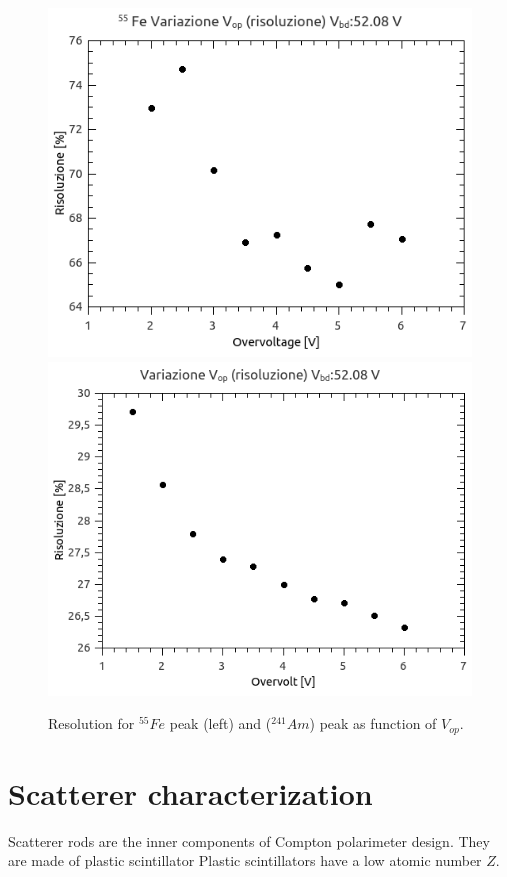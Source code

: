 \documentclass[10pt,a4paper, openany]{book}
\begin{document}
\begin{figure}[!h]
\begin{center}
\includegraphics[scale=0.35]{imm/resfe.png}
\includegraphics[scale=0.35]{imm/resam.png}
\end{center}
\caption{Resolution for $^{55}Fe$ peak (left) and ($^{241}Am$) peak as function of $V_{op}$.} 
\label{fig:res}
\end{figure}

\chapter{Scatterer characterization}
Scatterer rods are the inner components of Compton polarimeter design. They are made of plastic scintillator  
Plastic scintillators have a low atomic number $Z$.\\
\end{document}
